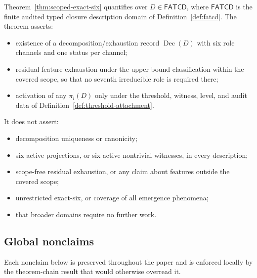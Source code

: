 \documentclass[11pt]{article}
\theoremstyle{definition}
\newcommand{\FATCD}{\ensuremath{\mathsf{FATCD}}}
\newcommand{\Dec}[1]{\ensuremath{\operatorname{Dec}\!\left(#1\right)}}
\begin{document}
Theorem~\ref{thm:scoped-exact-six} quantifies over \(D \in \FATCD{}\),
where \FATCD{} is the finite audited typed closure description domain
of Definition~\ref{def:fatcd}. The theorem asserts:
\begin{itemize}[topsep=2pt,itemsep=1pt]
  \item existence of a decomposition/exhaustion record \(\Dec{D}\)
    with six role channels and one status per channel;
  \item residual-feature exhaustion under the upper-bound
    classification within the covered scope, so that no seventh
    irreducible role is required there;
  \item activation of any \(\pi_i(D)\) only under the threshold,
    witness, level, and audit data of
    Definition~\ref{def:threshold-attachment}.
\end{itemize}

It does not assert:
\begin{itemize}[topsep=2pt,itemsep=1pt]
  \item decomposition uniqueness or canonicity;
  \item six active projections, or six active nontrivial witnesses, in
    every description;
  \item scope-free residual exhaustion, or any claim about features
    outside the covered scope;
  \item unrestricted exact-six, or coverage of all emergence
    phenomena;
  \item that broader domains require no further work.
\end{itemize}

\subsection{Global nonclaims}\label{subsec:global-nonclaims}

Each nonclaim below is preserved throughout the paper and is enforced
locally by the theorem-chain result that would otherwise overread it.
\end{document}

